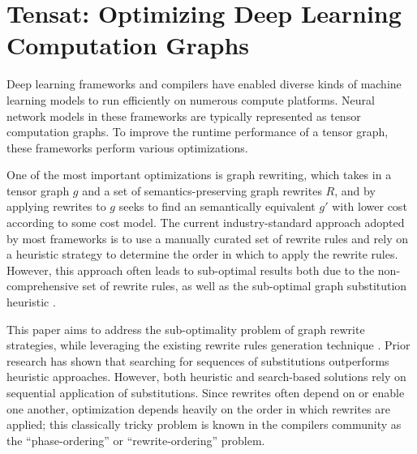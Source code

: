 \section{Tensat: Optimizing Deep Learning Computation Graphs}
\label{sec:tensat}

\newcommand{\ourname}{Tensat}

Deep learning frameworks and compilers
have enabled diverse kinds of machine learning models to run efficiently on numerous compute platforms. Neural network models in these frameworks are  typically represented as tensor computation graphs. To improve the runtime performance of a tensor graph, these frameworks perform various optimizations.

One of the most important optimizations is graph rewriting,
which takes in a tensor graph $g$ and a set of semantics-preserving graph rewrites $R$,
and by applying rewrites to $g$ seeks to find an semantically equivalent $g'$ with lower cost according to some cost model.
The current industry-standard approach adopted by most frameworks is to use a manually curated set of rewrite rules and rely on a heuristic strategy to determine the order in which to apply the rewrite rules.
However, this approach often leads to sub-optimal results both due to the non-comprehensive set of rewrite rules, as well as the sub-optimal graph substitution heuristic \cite{taso,metaflow}. %

This paper aims to address the sub-optimality problem of graph rewrite strategies, while leveraging the existing rewrite rules generation technique \cite{taso}.
Prior research has shown that searching for sequences of substitutions
\cite{taso,metaflow,Fang:sampling} outperforms heuristic approaches.
However, both heuristic and search-based solutions rely on sequential application of substitutions.
Since rewrites often depend on or enable one another,
optimization depends heavily on the order in which rewrites are applied;
this classically tricky problem is known in the compilers community as the ``phase-ordering'' or ``rewrite-ordering'' problem.


